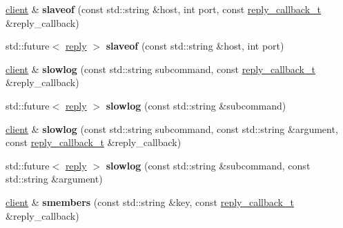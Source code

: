 \begin{DoxyCompactItemize}
\item 
\mbox{\label{classcpp__redis_1_1client_a5a8ff87da211196ca80a7c4badb0c378}} 
\hyperlink{classcpp__redis_1_1client}{client} \& {\bfseries slaveof} (const std\+::string \&host, int port, const \hyperlink{classcpp__redis_1_1client_a061a1140d36d2eaeda82b09a0bb3f9f2}{reply\+\_\+callback\+\_\+t} \&reply\+\_\+callback)
\item 
\mbox{\label{classcpp__redis_1_1client_a1731c94f72a209ffcba25767b8cab386}} 
std\+::future$<$ \hyperlink{classcpp__redis_1_1reply}{reply} $>$ {\bfseries slaveof} (const std\+::string \&host, int port)
\item 
\mbox{\label{classcpp__redis_1_1client_a2b9fce6f9d5c9ea1038a1c4b43b16a6d}} 
\hyperlink{classcpp__redis_1_1client}{client} \& {\bfseries slowlog} (const std\+::string subcommand, const \hyperlink{classcpp__redis_1_1client_a061a1140d36d2eaeda82b09a0bb3f9f2}{reply\+\_\+callback\+\_\+t} \&reply\+\_\+callback)
\item 
\mbox{\label{classcpp__redis_1_1client_a73f52f578ac8f266eb6e2b1f2a9cfdff}} 
std\+::future$<$ \hyperlink{classcpp__redis_1_1reply}{reply} $>$ {\bfseries slowlog} (const std\+::string \&subcommand)
\item 
\mbox{\label{classcpp__redis_1_1client_a62bc37eb1ef8a3b09ca58c091085c89b}} 
\hyperlink{classcpp__redis_1_1client}{client} \& {\bfseries slowlog} (const std\+::string subcommand, const std\+::string \&argument, const \hyperlink{classcpp__redis_1_1client_a061a1140d36d2eaeda82b09a0bb3f9f2}{reply\+\_\+callback\+\_\+t} \&reply\+\_\+callback)
\item 
\mbox{\label{classcpp__redis_1_1client_a4b3b0c8b11cc1e7f0bdb827eba6f7dc3}} 
std\+::future$<$ \hyperlink{classcpp__redis_1_1reply}{reply} $>$ {\bfseries slowlog} (const std\+::string \&subcommand, const std\+::string \&argument)
\item 
\mbox{\label{classcpp__redis_1_1client_a83458f3cff3680410d34f263cd9f30bc}} 
\hyperlink{classcpp__redis_1_1client}{client} \& {\bfseries smembers} (const std\+::string \&key, const \hyperlink{classcpp__redis_1_1client_a061a1140d36d2eaeda82b09a0bb3f9f2}{reply\+\_\+callback\+\_\+t} \&reply\+\_\+callback)

\end{DoxyCompactItemize}
